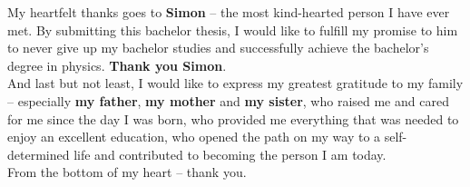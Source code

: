 \noindent My heartfelt thanks goes to \textbf{Simon} -- the most kind-hearted person I have ever met. By submitting this bachelor thesis, I would like to fulfill my promise to him to never give up my bachelor studies and successfully achieve the bachelor's degree in physics. \textbf{Thank you Simon}. \\

\noindent And last but not least, I would like to express my greatest gratitude to my family -- especially \textbf{my father}, \textbf{my mother} and \textbf{my sister}, who raised me and cared for me since the day I was born, who provided me everything that was needed to enjoy an excellent education, who opened the path on my way to a self-determined life and contributed to becoming the person I am today. \\

\noindent From the bottom of my heart -- thank you.
